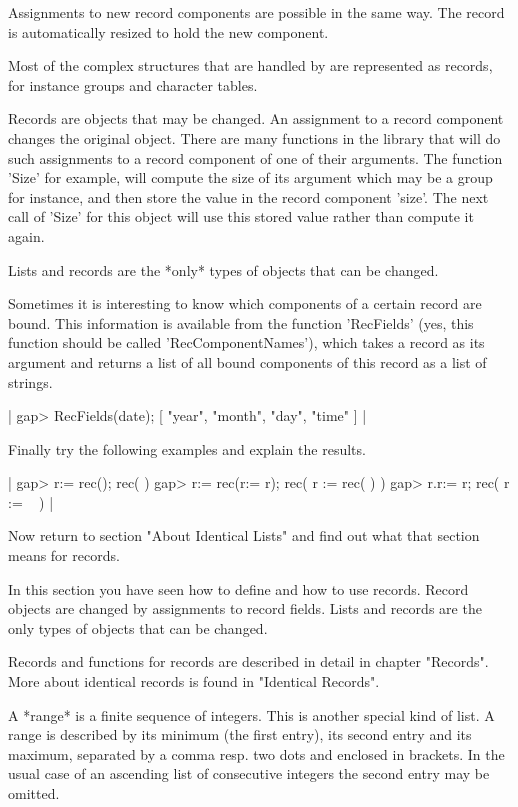 Assignments to  new record components are possible in the same way.   The
record is automatically resized to hold the new component.

Most of the complex structures that are handled by {\GAP} are represented
as records, for instance groups and character tables.

Records  are objects  that may  be changed.   An  assignment to a  record
component changes the original  object.  There are  many functions in the
library that will do  such assignments  to a  record component  of one of
their arguments.  The function 'Size' for  example, will compute the size
of its  argument which  may be a group for instance, and  then store  the
value in the record component 'size'.   The  next call of 'Size' for this
object will use this stored value rather than compute it again.

Lists and  records are  the *only*  types of {\GAP}  objects that  can be
changed.

Sometimes it is interesting  to know which components of a certain record
are bound.  This  information is available from the  function 'RecFields'
(yes, this  function should be called 'RecComponentNames'), which takes a
record as its argument and returns a list of all bound components of this
record as a list of strings.

|    gap> RecFields(date);
    [ "year", "month", "day", "time" ] |

Finally try the following examples and explain the results.

|    gap> r:= rec();
    rec(
       )
    gap> r:= rec(r:= r);
    rec(
      r := rec(
           ) )
    gap> r.r:= r;
    rec(
      r := ~ ) |

Now return to section  "About Identical Lists"  and  find  out what  that
section means for records.

In  this section you have   seen how to  define and  how to use  records.
Record objects are  changed by assignments to  record fields.  Lists  and
records are the only types of objects that can be changed.

Records and functions  for records are  described in  detail  in  chapter
"Records".  More about identical records is found in "Identical Records".


A *range* is a finite sequence of integers.  This is another special kind
of  list.   A  range is described by  its minimum (the first entry),  its
second entry  and its  maximum,  separated by a  comma resp. two dots and
enclosed  in  brackets.   In the  usual  case  of  an  ascending list  of
consecutive integers the second entry may be omitted.

